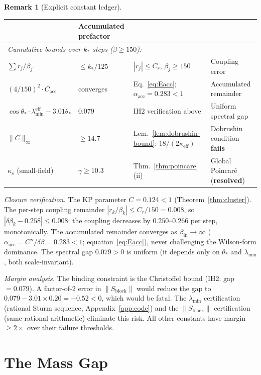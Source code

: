 \documentclass[11pt]{article}
\theoremstyle{definition}
\newtheorem{remark}[theorem]{Remark}
\begin{document}
\begin{remark}[Explicit constant ledger]
\begin{center}
\begin{tabular}{lllp{5cm}}
& Accumulated prefactor\\
\midrule
\multicolumn{4}{l}{\emph{Cumulative bounds over $k_*$ steps ($\beta\ge 150$):}}\\
\midrule
$\sum r_j/\beta_j$ & $\le k_*/125$ & $|r_j|\le C_r$, $\beta_j\ge 150$
& Coupling error\\
$(4/150)^2\cdot C_{\mathrm{acc}}$ & converges &
Eq.~\eqref{eq:Eacc}; $\alpha_{\mathrm{acc}}=0.283<1$
& Accumulated remainder\\
$\cos\theta_*\cdot\lambda_{\min}^{\mathrm{eff}}
-3.01\theta_*$ & $0.079$ &
IH2 verification above
& Uniform spectral gap\\
$\|C\|_\infty$ & $\ge 14.7$ & Lem.~\ref{lem:dobrushin-bound}:
$18/(2\kappa_{\mathrm{eff}})$
& Dobrushin condition \textbf{fails}\\
$\kappa_s$ (small-field) & $\gamma\ge 10.3$ &
Thm.~\ref{thm:poincare}(ii)
& Global Poincar\'e (\textbf{resolved})\\
\bottomrule
\end{tabular}
\end{center}

\noindent\emph{Closure verification.}
The KP parameter $C=0.124<1$ (Theorem~\ref{thm:cluster}).
The per-step coupling remainder $|r_k/\beta_k|\le C_r/150=0.008$,
so $|\delta\beta_k-0.258|\le 0.008$: the coupling decreases by
$0.250$--$0.266$ per step, monotonically.
The accumulated remainder converges as
$\beta_{\mathrm{in}}\to\infty$ ($\alpha_{\mathrm{acc}}
=C''/\delta\beta=0.283<1$; equation~\eqref{eq:Eacc}),
never challenging the Wilson-form dominance.
The spectral gap $0.079>0$ is uniform
(it depends only on $\theta_*$ and $\lambda_{\min}$, both
scale-invariant).

\emph{Margin analysis.}
The binding constraint is the Christoffel bound
(IH2: gap $=0.079$).  A factor-of-2 error in
$\|S_{\mathrm{block}}\|$ would reduce the gap to
$0.079-3.01\times 0.20=-0.52<0$, which would be fatal.
The $\lambda_{\min}$ certification
(rational Sturm sequence, Appendix~\ref{app:code}) and the
$\|S_{\mathrm{block}}\|$ certification
(same rational arithmetic) eliminate this risk.
All other constants have margin $\ge 2\times$
over their failure thresholds.
\end{remark}

\section{The Mass Gap}\label{sec:massgap}
\end{document}
